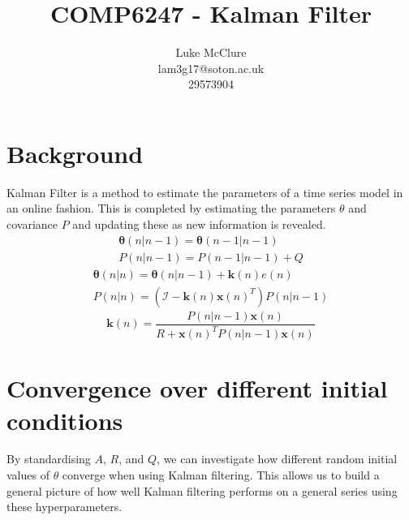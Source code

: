 \documentclass[sigconf]{acmart}
\begin{document}
\title{COMP6247 - Kalman Filter}
\author{Luke McClure \\ lam3g17@soton.ac.uk \\ 29573904}

\maketitle

\pagestyle{myheadings} 
\section{Background}
Kalman Filter is a method to estimate the parameters of a time series model in an online fashion. This is completed by estimating the parameters $\theta$ and covariance $P$ and updating these as new information is revealed.
\begin{align}
  \boldsymbol{\theta}(n|n-1) = \boldsymbol{\theta}(n-1|n-1) \\
  P(n|n-1) = P(n-1|n-1) + Q
  \label{eqn:p}
\end{align}
\begin{align}
  \boldsymbol{\theta}(n|n) = \boldsymbol{\theta}(n|n-1) + \boldsymbol{k}(n)e(n) \\
  P(n|n) = (\mathcal{I} - \boldsymbol{k}(n)\boldsymbol{x}(n)^{T})P(n|n-1)
  \label{eqn:thet}
\end{align}
\begin{equation}
  \boldsymbol{k}(n) = \frac{P(n|n-1)\boldsymbol{x}(n)}{R + \boldsymbol{x}(n)^{T}P(n|n-1)\boldsymbol{x}(n)}
  \label{eqn:k}
\end{equation}
\section{Convergence over different initial conditions}
By standardising $A$, $R$, and $Q$, we can investigate how different random initial values of $\theta$ converge when using Kalman filtering. This allows us to build a general picture of how well Kalman filtering performs on a general series using these hyperparameters. 
\end{document}
